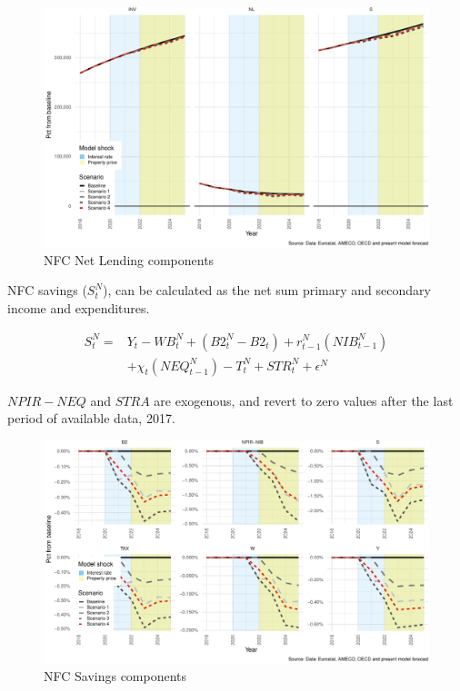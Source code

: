 \documentclass[
]{book}
\begin{document}
\begin{figure}
\centering
\includegraphics{figures/fl-fi-sfc-plot-nfc-indicators-nl-actuals-1.pdf}
\caption{\label{fig:fl-fi-sfc-plot-nfc-indicators-nl-actuals}NFC Net Lending components}
\end{figure}

NFC savings (\(S^N_t\)), can be calculated as the net sum primary and secondary income and expenditures.

\begin{equation}
\begin{split}
S^N_t = & Y_t - WB^N_t + (B2^N_{t} - B2_{t}) + r^N_{t-1}(NIB^N_{t-1})\\
        & + \chi _t (NEQ^N_{t-1}) - T^N_t + STR^N_t + \epsilon ^N
\end{split}
\end{equation}

\(NPIR-NEQ\) and \(STRA\) are exogenous, and revert to zero values after the last period of available data, 2017.

\begin{figure}
\centering
\includegraphics{figures/fl-fi-sfc-plot-nfc-indicators-saving-1.pdf}
\caption{\label{fig:fl-fi-sfc-plot-nfc-indicators-saving}NFC Savings components}
\end{figure}
\end{document}
